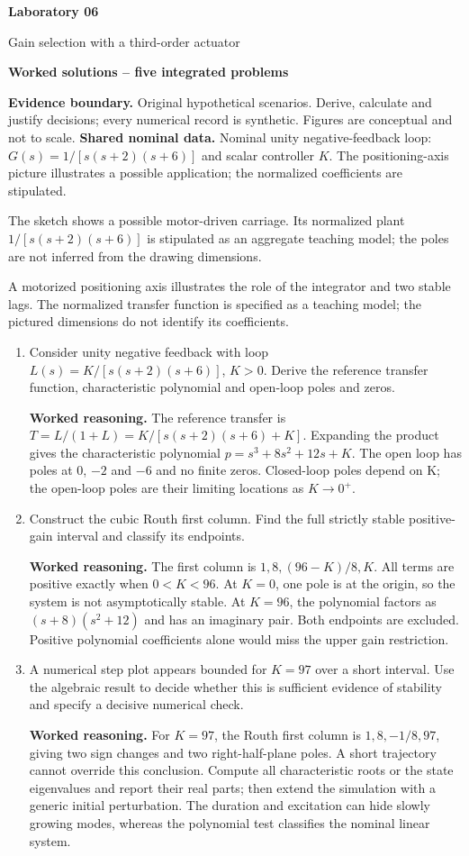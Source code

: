 \documentclass[10pt,a4paper]{article}
\newcommand{\task}[2]{\par\medskip{\color{ink}\Large\bfseries #1. #2}\par\smallskip}
\newcommand{\answer}{\par\smallskip\textbf{Worked reasoning.} }
\begin{document}
{\color{ink}\LARGE\bfseries Laboratory 06}\par
{\large Gain selection with a third-order actuator}\par
\textbf{Worked solutions -- five integrated problems}\par
{\small\textbf{Evidence boundary.} Original hypothetical scenarios. Derive, calculate and justify decisions; every numerical record is synthetic. Figures are conceptual and not to scale.}
\smallskip\textbf{Shared nominal data.} Nominal unity negative-feedback loop: $G(s)=1/[s(s+2)(s+6)]$ and scalar controller $K$. The positioning-axis picture illustrates a possible application; the normalized coefficients are stipulated.
\task{1}{A position actuator with an identified aggregate model}
The sketch shows a possible motor-driven carriage. Its normalized plant $1/[s(s+2)(s+6)]$ is stipulated as an aggregate teaching model; the poles are not inferred from the drawing dimensions.
\begin{center}\resizebox{.60\linewidth}{!}{}\par{\small A motorized positioning axis illustrates the role of the integrator and two stable lags. The normalized transfer function is specified as a teaching model; the pictured dimensions do not identify its coefficients.}\end{center}
\begin{enumerate}
\item Consider unity negative feedback with loop $L(s)=K/[s(s+2)(s+6)]$, $K>0$. Derive the reference transfer function, characteristic polynomial and open-loop poles and zeros.
\answer The reference transfer is $T=L/(1+L)=K/[s(s+2)(s+6)+K]$. Expanding the product gives the characteristic polynomial $p=s^3+8s^2+12s+K$. The open loop has poles at 0, $-2$ and $-6$ and no finite zeros. Closed-loop poles depend on K; the open-loop poles are their limiting locations as $K\to0^+$.
\item Construct the cubic Routh first column. Find the full strictly stable positive-gain interval and classify its endpoints.
\answer The first column is $1,8,(96-K)/8,K$. All terms are positive exactly when $0<K<96$. At $K=0$, one pole is at the origin, so the system is not asymptotically stable. At $K=96$, the polynomial factors as $(s+8)(s^2+12)$ and has an imaginary pair. Both endpoints are excluded. Positive polynomial coefficients alone would miss the upper gain restriction.
\item A numerical step plot appears bounded for $K=97$ over a short interval. Use the algebraic result to decide whether this is sufficient evidence of stability and specify a decisive numerical check.
\answer For $K=97$, the Routh first column is $1,8,-1/8,97$, giving two sign changes and two right-half-plane poles. A short trajectory cannot override this conclusion. Compute all characteristic roots or the state eigenvalues and report their real parts; then extend the simulation with a generic initial perturbation. The duration and excitation can hide slowly growing modes, whereas the polynomial test classifies the nominal linear system.
\end{enumerate}
\end{document}
